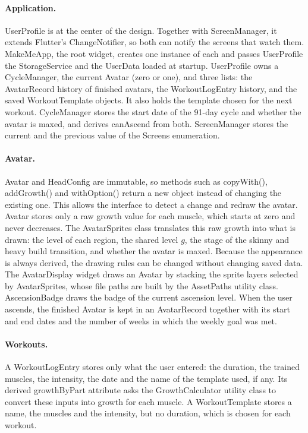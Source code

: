 \documentclass[11pt]{article}
\begin{document}
\paragraph{Application.}
UserProfile is at the center of the design. Together with ScreenManager, it extends Flutter's ChangeNotifier, so
both can notify the screens that watch them. MakeMeApp, the root widget, creates one instance of each and passes
UserProfile the StorageService and the UserData loaded at startup. UserProfile owns a CycleManager, the current
Avatar (zero or one), and three lists: the AvatarRecord history of finished avatars, the WorkoutLogEntry history,
and the saved WorkoutTemplate objects. It also holds the template chosen for the next workout. CycleManager stores
the start date of the 91-day cycle and whether the avatar is maxed, and derives canAscend from both. ScreenManager
stores the current and the previous value of the Screens enumeration.

\paragraph{Avatar.}
Avatar and HeadConfig are immutable, so methods such as copyWith(), addGrowth() and withOption() return a new
object instead of changing the existing one. This allows the interface to detect a change and redraw the avatar.
Avatar stores only a raw growth value for each muscle, which starts at zero and never decreases. The AvatarSprites
class translates this raw growth into what is drawn: the level of each region, the shared level $g$, the stage of
the skinny and heavy build transition, and whether the avatar is maxed. Because the appearance is always derived,
the drawing rules can be changed without changing saved data. The AvatarDisplay widget draws an Avatar by stacking
the sprite layers selected by AvatarSprites, whose file paths are built by the AssetPaths utility class.
AscensionBadge draws the badge of the current ascension level. When the user ascends, the finished Avatar is
kept in an AvatarRecord together with its start and end dates and the number of weeks in which the weekly goal
was met.

\paragraph{Workouts.}
A WorkoutLogEntry stores only what the user entered: the duration, the trained muscles, the intensity, the date and
the name of the template used, if any. Its derived growthByPart attribute asks the GrowthCalculator utility class to
convert these inputs into growth for each muscle. A WorkoutTemplate stores a name, the muscles and the intensity,
but no duration, which is chosen for each workout.
\end{document}
